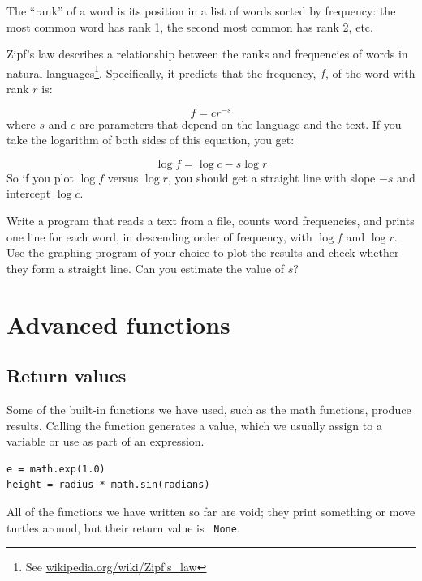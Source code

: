 \begin{ex}


The ``rank'' of a word is its position in a list of words
sorted by frequency: the most common word has rank 1, the
second most common has rank 2, etc.

Zipf's law describes a relationship between the ranks and frequencies
of words in natural languages\footnote{See
  \url{wikipedia.org/wiki/Zipf's_law}}.  Specifically, it
predicts that the frequency, $f$, of the word with rank $r$ is:

\[ f = c r^{-s} \]
%
where $s$ and $c$ are parameters that depend on the language and the
text.  If you take the logarithm of both sides of this equation, you
get:


\[ \log f = \log c - s \log r \]
%
So if you plot $\log f$ versus $\log r$, you should get
a straight line with slope $-s$ and intercept $\log c$.

Write a program that reads a text from a file, counts
word frequencies, and prints one line
for each word, in descending order of frequency, with
$\log f$ and $\log r$.  Use the graphing program of your
choice to plot the results and check whether they form
a straight line.  Can you estimate the value of $s$?
\end{ex}

\chapter{Advanced functions}
\label{fruitchap}

\section{Return values}

Some of the built-in functions we have used, such as the math
functions, produce results.  Calling the function generates a
value, which we usually assign to a variable or use as part of an
expression.

\beforeverb
\begin{verbatim}
e = math.exp(1.0)
height = radius * math.sin(radians)
\end{verbatim}
\afterverb
%
All of the functions we have written so far are void; they print
something or move turtles around, but their return value is {\tt
None}.

